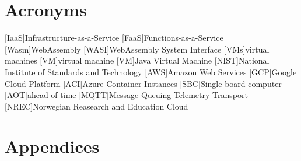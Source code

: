 \documentclass[
  table]{report}
\begin{document}
\chapter*{Acronyms}
\begin{acronym}
  [IaaS]{Infrastructure-as-a-Service}
  [FaaS]{Functions-as-a-Service}
  [Wasm]{WebAssembly}
  [WASI]{WebAssembly System Interface}
  [VMs]{virtual machines}
  [VM]{virtual machine}
  [VM]{Java Virtual Machine}
  [NIST]{National Institute of Standards and Technology}
  [AWS]{Amazon Web Services}
  [GCP]{Google Cloud Platform}
  [ACI]{Azure Container Instances}
  [SBC]{Single board computer}
  [AOT]{ahead-of-time}
  [MQTT]{Message Queuing Telemetry Transport}
  [NREC]{Norwegian Reasearch and Education Cloud}
\end{acronym}

\chapter*{Appendices}

\printbibliography
\end{document}
